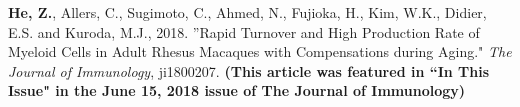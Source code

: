 

\begin{cventries}


  \cventry
    {} %
    {} %
    {} %
    {} %
    {
    \textbf{He, Z.}, Allers, C., Sugimoto, C., Ahmed, N., Fujioka, H., Kim, W.K., Didier, E.S. and Kuroda, M.J., 2018. ''Rapid Turnover and High Production Rate of Myeloid Cells in Adult Rhesus Macaques with Compensations during Aging." \emph{The Journal of Immunology}, ji1800207. 
    \textbf{(This article was featured in “In This Issue" in the June 15, 2018 issue of The Journal of Immunology)}
    }

\end{cventries}